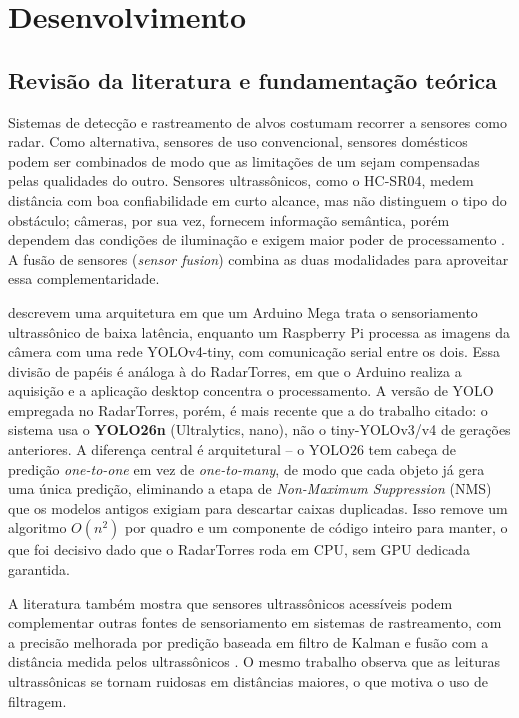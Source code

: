 \documentclass[12pt,a4paper]{article}
\begin{document}
\section{Desenvolvimento}

\subsection{Revisão da literatura e fundamentação teórica}

Sistemas de detecção e rastreamento de alvos costumam recorrer a sensores como radar. Como
alternativa, sensores de uso convencional, sensores domésticos podem ser combinados de modo que as
limitações de um sejam compensadas pelas qualidades do outro. Sensores ultrassônicos, como o HC-SR04, medem
distância com boa confiabilidade em curto alcance, mas não distinguem o tipo do obstáculo;
câmeras, por sua vez, fornecem informação semântica, porém dependem das condições de iluminação e
exigem maior poder de processamento \cite{majoni2025}. A fusão de sensores (\textit{sensor
fusion}) combina as duas modalidades para aproveitar essa complementaridade.

 descrevem uma arquitetura em que um Arduino Mega trata o sensoriamento
ultrassônico de baixa latência, enquanto um Raspberry Pi processa as imagens da câmera com uma rede
YOLOv4-tiny, com comunicação serial entre os dois. Essa divisão de papéis é análoga à do
RadarTorres, em que o Arduino realiza a aquisição e a aplicação desktop concentra o processamento.
A versão de YOLO empregada no RadarTorres, porém, é mais recente que a do trabalho citado: o
sistema usa o \textbf{YOLO26n} (Ultralytics, nano), não o tiny-YOLOv3/v4 de gerações anteriores. A
diferença central é arquitetural -- o YOLO26 tem cabeça de predição \textit{one-to-one} em vez de
\textit{one-to-many}, de modo que cada objeto já gera uma única predição, eliminando a etapa de
\textit{Non-Maximum Suppression} (NMS) que os modelos antigos exigiam para descartar caixas
duplicadas. Isso remove um algoritmo $O(n^2)$ por quadro e um componente de código inteiro para
manter, o que foi decisivo dado que o RadarTorres roda em CPU, sem GPU dedicada garantida.

A literatura também mostra que sensores ultrassônicos acessíveis podem complementar outras fontes
de sensoriamento em sistemas de rastreamento, com a precisão melhorada por predição baseada em
filtro de Kalman e fusão com a distância medida pelos ultrassônicos \cite{curbscan}. O mesmo trabalho observa
que as leituras ultrassônicas se tornam ruidosas em distâncias maiores, o que motiva o uso de
filtragem.
\end{document}
